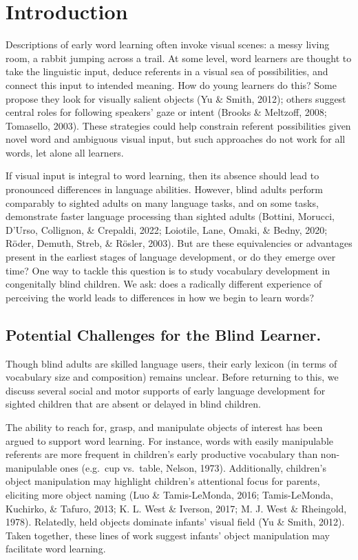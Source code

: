 \documentclass[
  man,floatsintext]{apa6}
\begin{document}
\hypertarget{introduction}{%
\section{Introduction}\label{introduction}}

Descriptions of early word learning often invoke visual scenes: a messy living room, a rabbit jumping across a trail. At some level, word learners are thought to take the linguistic input, deduce referents in a visual sea of possibilities, and connect this input to intended meaning. How do young learners do this? Some propose they look for visually salient objects (Yu \& Smith, 2012); others suggest central roles for following speakers' gaze or intent (Brooks \& Meltzoff, 2008; Tomasello, 2003). These strategies could help constrain referent possibilities given novel word and ambiguous visual input, but such approaches do not work for all words, let alone all learners.

If visual input is integral to word learning, then its absence should lead to pronounced differences in language abilities. However, blind adults perform comparably to sighted adults on many language tasks, and on some tasks, demonstrate faster language processing than sighted adults (Bottini, Morucci, D'Urso, Collignon, \& Crepaldi, 2022; Loiotile, Lane, Omaki, \& Bedny, 2020; Röder, Demuth, Streb, \& Rösler, 2003). But are these equivalencies or advantages present in the earliest stages of language development, or do they emerge over time? One way to tackle this question is to study vocabulary development in congenitally blind children. We ask: does a radically different experience of perceiving the world leads to differences in how we begin to learn words?

\hypertarget{potential-challenges-for-the-blind-learner.}{%
\subsection{Potential Challenges for the Blind Learner.}\label{potential-challenges-for-the-blind-learner.}}

Though blind adults are skilled language users, their early lexicon (in terms of vocabulary size and composition) remains unclear. Before returning to this, we discuss several social and motor supports of early language development for sighted children that are absent or delayed in blind children.

The ability to reach for, grasp, and manipulate objects of interest has been argued to support word learning. For instance, words with easily manipulable referents are more frequent in children's early productive vocabulary than non-manipulable ones (e.g.~cup vs.~table, Nelson, 1973). Additionally, children's object manipulation may highlight children's attentional focus for parents, eliciting more object naming (Luo \& Tamis-LeMonda, 2016; Tamis-LeMonda, Kuchirko, \& Tafuro, 2013; K. L. West \& Iverson, 2017; M. J. West \& Rheingold, 1978). Relatedly, held objects dominate infants' visual field (Yu \& Smith, 2012). Taken together, these lines of work suggest infants' object manipulation may facilitate word learning.
\end{document}
